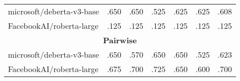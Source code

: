 \begin{table*}[hbt!]
\begin{center}
\begin{tabular}{lcccccc}
			microsoft/deberta-v3-base & .650              & .650              & .525             & .625                 & .625                        & .608             \\
			FacebookAI/roberta-large  & .125              & .125              & .125             & .125                 & .125                        & .125             \\
			\midrule
			\multicolumn{7}{c}{\textbf{Pairwise}}                                                                                                                        \\
			\midrule
			microsoft/deberta-v3-base & .650              & .570              & .650             & .650                 & .525                        & .623             \\
			FacebookAI/roberta-large    & .675              & .700              & .725             & .650                 & .600                        & .700             \\
			\bottomrule
		\end{tabular}
	\end{center}
\end{table*}

